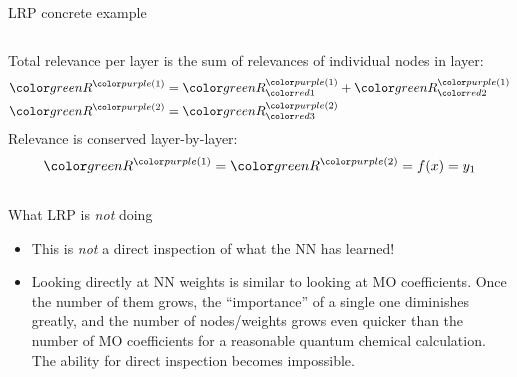 \documentclass[xetex,compress]{beamer}
\makeatletter
\def\mathcolor#1#{\@mathcolor{#1}}
\def\@mathcolor#1#2#3{%
  \protect\leavevmode
  \begingroup
    \color#1{#2}#3%
  \endgroup
}
\makeatother
\begin{document}
\begin{frame}{LRP concrete example}
\begin{columns}
\begin{column}{0.5\textwidth}
\begin{equation*}
      \end{equation*}
      Total relevance per layer is the sum of relevances of individual nodes in layer:
      \begin{align*}
        \mathcolor{green}{R}^{\mathcolor{purple}{(1)}} &= \mathcolor{green}{R}_{\mathcolor{red}{1}}^{\mathcolor{purple}{(1)}} + \mathcolor{green}{R}_{\mathcolor{red}{2}}^{\mathcolor{purple}{(1)}} \\
        \mathcolor{green}{R}^{\mathcolor{purple}{(2)}} &= \mathcolor{green}{R}_{\mathcolor{red}{3}}^{\mathcolor{purple}{(2)}}
      \end{align*}
      Relevance is conserved layer-by-layer:
      \begin{equation*}
        \mathcolor{green}{R}^{\mathcolor{purple}{(1)}} = \mathcolor{green}{R}^{\mathcolor{purple}{(2)}} = f(x) = y_1
      \end{equation*}
    \end{column}
  \end{columns}
\end{frame}

\begin{frame}{What LRP is \protect\emph{not} doing}
  \begin{itemize}
    \item This is \emph{not} a direct inspection of what the NN has learned!
    \item Looking directly at NN weights is similar to looking at MO coefficients. Once the number of them grows, the ``importance'' of a single one diminishes greatly, and the number of nodes/weights grows even quicker than the number of MO coefficients for a reasonable quantum chemical calculation. The ability for direct inspection becomes impossible.
  \end{itemize}
\end{frame}

\end{document}
